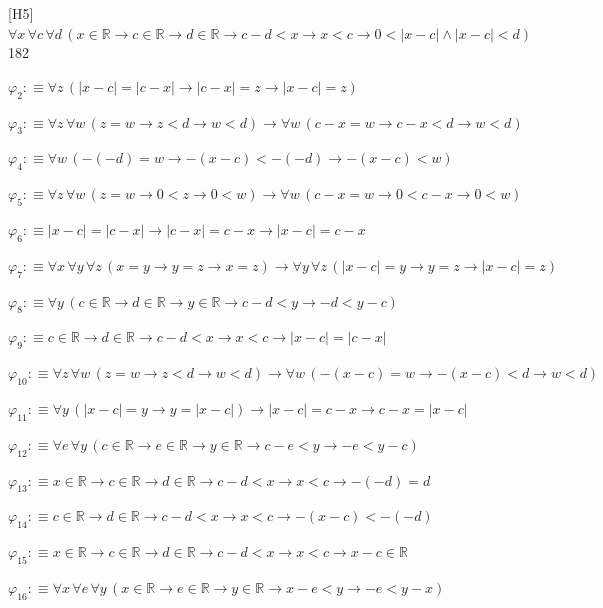 \begin{fullproof}{[H5]}{$\forall x\,\forall c\,\forall d\,(x \in \mathbb{R} \to c \in \mathbb{R} \to d \in \mathbb{R} \to c - d < x \to x < c \to 0 < \lvert x - c \rvert \land \lvert x - c \rvert < d)$}{182}
\begin{abbrevlist}
\item $\varphi_{2} :\equiv \forall z\,(\lvert x - c \rvert = \lvert c - x \rvert \to \lvert c - x \rvert = z \to \lvert x - c \rvert = z)$
\item $\varphi_{3} :\equiv \forall z\,\forall w\,(z = w \to z < d \to w < d) \to \forall w\,(c - x = w \to c - x < d \to w < d)$
\item $\varphi_{4} :\equiv \forall w\,(-(-d) = w \to -(x - c) < -(-d) \to -(x - c) < w)$
\item $\varphi_{5} :\equiv \forall z\,\forall w\,(z = w \to 0 < z \to 0 < w) \to \forall w\,(c - x = w \to 0 < c - x \to 0 < w)$
\item $\varphi_{6} :\equiv \lvert x - c \rvert = \lvert c - x \rvert \to \lvert c - x \rvert = c - x \to \lvert x - c \rvert = c - x$
\item $\varphi_{7} :\equiv \forall x\,\forall y\,\forall z\,(x = y \to y = z \to x = z) \to \forall y\,\forall z\,(\lvert x - c \rvert = y \to y = z \to \lvert x - c \rvert = z)$
\item $\varphi_{8} :\equiv \forall y\,(c \in \mathbb{R} \to d \in \mathbb{R} \to y \in \mathbb{R} \to c - d < y \to -d < y - c)$
\item $\varphi_{9} :\equiv c \in \mathbb{R} \to d \in \mathbb{R} \to c - d < x \to x < c \to \lvert x - c \rvert = \lvert c - x \rvert$
\item $\varphi_{10} :\equiv \forall z\,\forall w\,(z = w \to z < d \to w < d) \to \forall w\,(-(x - c) = w \to -(x - c) < d \to w < d)$
\item $\varphi_{11} :\equiv \forall y\,(\lvert x - c \rvert = y \to y = \lvert x - c \rvert) \to \lvert x - c \rvert = c - x \to c - x = \lvert x - c \rvert$
\item $\varphi_{12} :\equiv \forall e\,\forall y\,(c \in \mathbb{R} \to e \in \mathbb{R} \to y \in \mathbb{R} \to c - e < y \to -e < y - c)$
\item $\varphi_{13} :\equiv x \in \mathbb{R} \to c \in \mathbb{R} \to d \in \mathbb{R} \to c - d < x \to x < c \to -(-d) = d$
\item $\varphi_{14} :\equiv c \in \mathbb{R} \to d \in \mathbb{R} \to c - d < x \to x < c \to -(x - c) < -(-d)$
\item $\varphi_{15} :\equiv x \in \mathbb{R} \to c \in \mathbb{R} \to d \in \mathbb{R} \to c - d < x \to x < c \to x - c \in \mathbb{R}$
\item $\varphi_{16} :\equiv \forall x\,\forall e\,\forall y\,(x \in \mathbb{R} \to e \in \mathbb{R} \to y \in \mathbb{R} \to x - e < y \to -e < y - x)$

\end{abbrevlist}
\end{fullproof}
